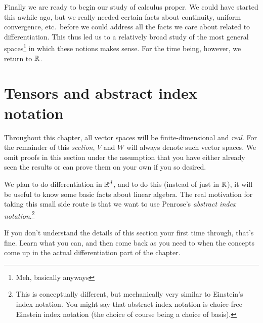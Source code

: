 Finally we are ready to begin our study of calculus proper.  We could have started this awhile ago, but we really needed certain facts about continuity, uniform convergence, etc.~before we could address all the facts we care about related to differentiation.  This thus led us to a relatively broad study of the most general spaces\footnote{Meh, basically anyways} in which these notions makes sense.  For the time being, however, we return to $\mathbb{R}$.

\section{Tensors and abstract index notation}

\begin{displayquote}
Throughout this chapter, all vector spaces will be finite-dimensional and \emph{real}.  For the remainder of this \emph{section}, $V$ and $W$ will always denote such vector spaces.  We omit proofs in this section under the assumption that you have either already seen the results or can prove them on your own if you so desired.
\end{displayquote}

We plan to do differentiation in $\mathbb{R} ^d$, and to do this (instead of just in $\mathbb{R}$), it will be useful to know some basic facts about linear algebra.  The real motivation for taking this small side route is that we want to use Penrose's \emph{abstract index notation}.\footnote{This is conceptually different, but mechanically very similar to Einstein's index notation.  You might say that abstract index notation is choice-free Einstein index notation (the choice of course being a choice of basis).}

\begin{displayquote}
If you don't understand the details of this section your first time through, that's fine.  Learn what you can, and then come back as you need to when the concepts come up in the actual differentiation part of the chapter.
\end{displayquote}


